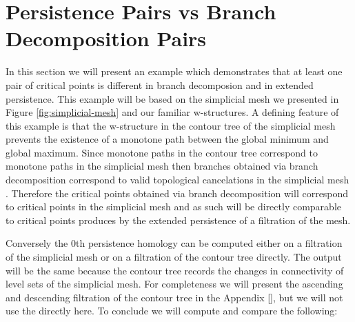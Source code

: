\section{Persistence Pairs vs Branch Decomposition Pairs}

In this section we will present an example which demonstrates that at least one pair of critical points is different in branch decomposion and in extended persistence. This example will be based on the simplicial mesh we presented in Figure \ref{fig:simplicial-mesh} and our familiar w-structures. A defining feature of this example is that the w-structure in the contour tree of the simplicial mesh prevents the existence of a monotone path between the global minimum and global maximum. Since monotone paths in the contour tree correspond to monotone paths in the simplicial mesh \cite{ct-big-paper} then branches obtained via branch decomposition correspond to valid topological cancelations in the simplicial mesh \cite{ct-branch-decomp}. Therefore the critical points obtained via branch decomposition will correspond to critical points in the simplicial mesh and as such will be directly comparable to critical points produces by the extended persistence of a filtration of the mesh.

Conversely the 0th persistence homology can be computed either on a filtration of the simplicial mesh or on a filtration of the contour tree directly. The output will be the same because the contour tree records the changes in connectivity of level sets of the simplicial mesh. For completeness we will present the ascending and descending filtration of the contour tree in the Appendix [], but we will not use the directly here. To conclude we will compute and compare the following:

